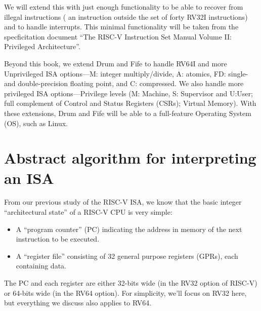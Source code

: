 We will extend this with just enough functionality to be able to
recover from illegal instructions ({\ie} an instruction outside the
set of forty RV32I instructions) and to handle interrupts.  This
minimal functionality will be taken from the specficitation document
``The RISC-V Instruction Set Manual Volume II: Privileged
Architecture''\cite{RISCV_Priv_2021_12_03}.

Beyond this book, we extend Drum and Fife to handle RV64I and more
Unprivileged ISA options---M: integer multiply/divide, A: atomics, FD:
single-and double-precision floating point, and C: compressed. We also
handle more privileged ISA options---Privilege levels (M: Machine, S:
Supervisor and U:User; full complement of Control and Status Registers
(CSRs); Virtual Memory).  With these extensions, Drum and Fife
will be able to a full-feature Operating System (OS), such as Linux.


\section{Abstract algorithm for interpreting an ISA}

\label{Sec_ISA_Exec_Algorithm}


From our previous study of the RISC-V ISA, we know that the basic
integer ``architectural state'' of a RISC-V CPU is very simple:

\begin{itemize}

\item A ``program counter'' (PC) indicating the address in memory of
the next instruction to be executed.

\item A ``register file'' consisting of 32 general purpose registers
(GPRs), each containing data.

\end{itemize}

The PC and each register are either 32-bits wide (in the RV32 option
of RISC-V) or 64-bits wide (in the RV64 option).  For simplicity,
we'll focus on RV32 here, but everything we discuss also applies to
RV64.

